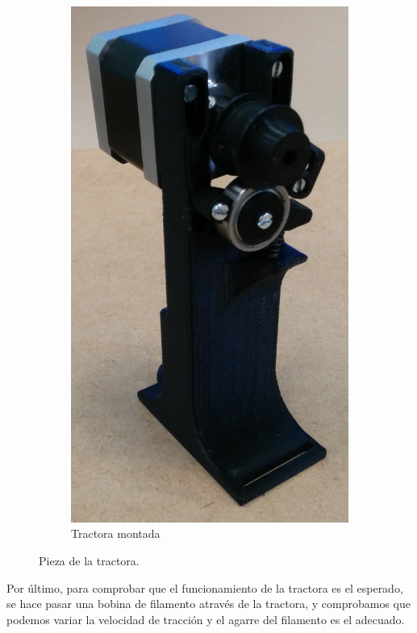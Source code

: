 \begin{figure}[H]
\begin{subfigure}[b]{0.3\textwidth}
        \includegraphics[width=\linewidth]{images/producciones/tractora/IMG_20150804_090625.jpg}
        \caption{Tractora montada}
        \label{fig:tractora_montada}
    \end{subfigure}
    \caption{Pieza de la tractora.}
    \label{fig:tractora_montaj}
\end{figure}

Por último, para comprobar que el funcionamiento de la tractora es el esperado, se hace pasar una bobina de filamento através de la tractora, y comprobamos que podemos variar la velocidad de tracción y el agarre del filamento es el adecuado.

